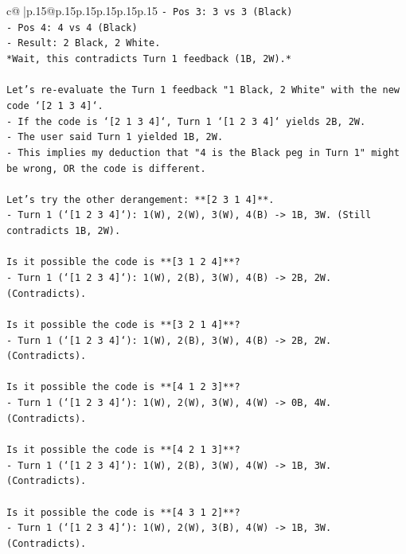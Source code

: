 \documentclass{article}
\begin{document}
{\begin{supertabular}{c@{$\;$}|p{.15\linewidth}@{}p{.15\linewidth}p{.15\linewidth}p{.15\linewidth}p{.15\linewidth}p{.15\linewidth}}
{{{\texttt{{-} Pos 3: 3 vs 3 (Black)} \\
\texttt{{-} Pos 4: 4 vs 4 (Black)} \\
\texttt{{-} Result: 2 Black, 2 White.} \\
\texttt{*Wait, this contradicts Turn 1 feedback (1B, 2W).*} \\
\\ 
\texttt{Let's re{-}evaluate the Turn 1 feedback "1 Black, 2 White" with the new code `{[}2 1 3 4{]}`.} \\
\texttt{{-} If the code is `{[}2 1 3 4{]}`, Turn 1 `{[}1 2 3 4{]}` yields 2B, 2W.} \\
\texttt{{-} The user said Turn 1 yielded 1B, 2W.} \\
\texttt{{-} This implies my deduction that "4 is the Black peg in Turn 1" might be wrong, OR the code is different.} \\
\\ 
\texttt{Let's try the other derangement: **{[}2 3 1 4{]}**.} \\
\texttt{{-} Turn 1 (`{[}1 2 3 4{]}`): 1(W), 2(W), 3(W), 4(B) {-}> 1B, 3W. (Still contradicts 1B, 2W).} \\
\\ 
\texttt{Is it possible the code is **{[}3 1 2 4{]}**?} \\
\texttt{{-} Turn 1 (`{[}1 2 3 4{]}`): 1(W), 2(B), 3(W), 4(B) {-}> 2B, 2W. (Contradicts).} \\
\\ 
\texttt{Is it possible the code is **{[}3 2 1 4{]}**?} \\
\texttt{{-} Turn 1 (`{[}1 2 3 4{]}`): 1(W), 2(B), 3(W), 4(B) {-}> 2B, 2W. (Contradicts).} \\
\\ 
\texttt{Is it possible the code is **{[}4 1 2 3{]}**?} \\
\texttt{{-} Turn 1 (`{[}1 2 3 4{]}`): 1(W), 2(W), 3(W), 4(W) {-}> 0B, 4W. (Contradicts).} \\
\\ 
\texttt{Is it possible the code is **{[}4 2 1 3{]}**?} \\
\texttt{{-} Turn 1 (`{[}1 2 3 4{]}`): 1(W), 2(B), 3(W), 4(W) {-}> 1B, 3W. (Contradicts).} \\
\\ 
\texttt{Is it possible the code is **{[}4 3 1 2{]}**?} \\
\texttt{{-} Turn 1 (`{[}1 2 3 4{]}`): 1(W), 2(W), 3(B), 4(W) {-}> 1B, 3W. (Contradicts).} \\
\\ 
}}}
\end{supertabular}}
\end{document}
